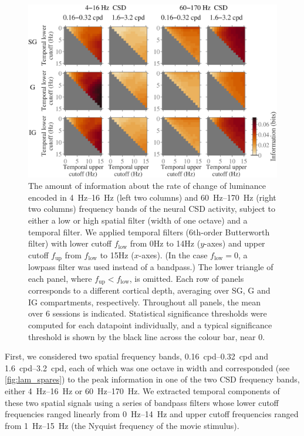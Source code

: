 \begin{figure}[htbp]
\centering
\includegraphics[scale=.5]{figs/tmf/tmf-v-tmf-sggig-avg-tmfres1b-2Band-2Crs.eps}
%
\caption{
The amount of information about the rate of change of luminance encoded in \SIrange{4}{16}{Hz} (left two columns) and \SIrange{60}{170}{Hz} (right two columns) frequency bands of the neural \ac{CSD} activity, subject to either a low or high spatial filter (width of one octave) and a temporal filter.
We applied temporal filters (6th-order Butterworth filter) with lower cutoff $f_\text{low}$ from \num{0}{Hz} to \num{14}{Hz} ($y$-axes) and upper cutoff $f_\text{up}$ from $f_\text{low}$ to \num{15}{Hz} ($x$-axes).
(In the case $f_\text{low} = 0$, a lowpass filter was used instead of a bandpass.)
The lower triangle of each panel, where $f_\text{up} < f_\text{low}$, is omitted.
Each row of panels corresponds to a different cortical depth, averaging over \ac{SG}, \ac{G} and \ac{IG} compartments, respectively.
Throughout all panels, the mean over \num{6} sessions is indicated.
Statistical significance thresholds were computed for each datapoint individually, and a typical significance threshold is shown by the black line across the colour bar, near $0$.
}
\label{fig:lam_tmf}
%
\end{figure}

First, we considered two spatial frequency bands, \SIrange{0.16}{0.32}{cpd} and \SIrange{1.6}{3.2}{cpd}, each of which was one octave in width and corresponded (see \autoref{fig:lam_spares}) to the peak information in one of the two \ac{CSD} frequency bands, either \SIrange{4}{16}{Hz} or \SIrange{60}{170}{Hz}.
We extracted temporal components of these two spatial signals using a series of bandpass filters whose lower cutoff frequencies ranged linearly from \SIrange{0}{14}{Hz} and upper cutoff frequencies ranged from \SIrange{1}{15}{Hz} (the Nyquist frequency of the movie stimulus).

